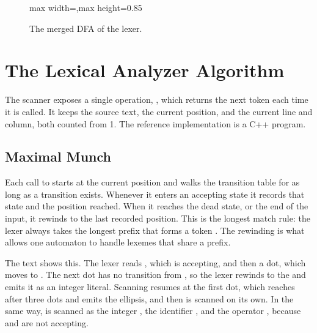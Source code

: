 \begin{figure}[H]
\begin{adjustbox}{max width=\linewidth,max height=0.85\textheight}
\end{adjustbox}
\caption{The merged DFA of the lexer.}
\label{fig:dfa-merged}
\end{figure}

\section{The Lexical Analyzer Algorithm}
\label{sec:lexer-algorithm}

The scanner exposes a single operation, , which returns the next
token each time it is called. It keeps the source text, the current position,
and the current line and column, both counted from 1. The reference
implementation is a C++ program.

\subsection{Maximal Munch}

Each call to  starts at the current position and walks the
transition table for as long as a transition exists. Whenever it enters an
accepting state it records that state and the position reached. When it
reaches the dead state, or the end of the input, it rewinds to the last
recorded position. This is the longest match rule: the lexer always takes the
longest prefix that forms a token \cite{aho2006compilers}. The rewinding is
what allows one automaton to handle lexemes that share a prefix.

The text  shows this. The lexer reads , which is accepting,
and then a dot, which moves to . The next dot has no transition
from , so the lexer rewinds to the  and emits it as an
integer literal. Scanning resumes at the first dot, which reaches
 after three dots and emits the ellipsis, and then  is
scanned on its own. In the same way,  is scanned as the integer
, the identifier , and the operator \code{+}, because
 and  are not accepting.


